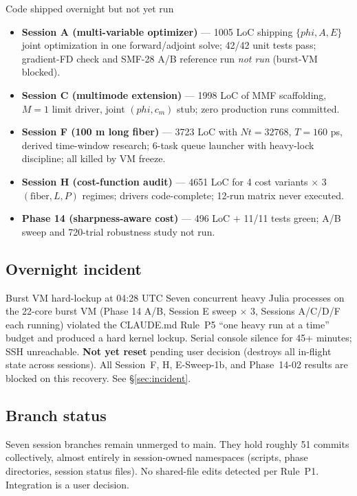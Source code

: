 \documentclass[11pt,letterpaper]{article}
\def\varphi{phi}%
\def\mathrm#1{#1}%
\def\texttt#1{#1}%
\begin{document}
\begin{verdict}{Code shipped overnight but not yet run}
\begin{itemize}[leftmargin=*]
  \item \textbf{Session A (multi-variable optimizer)} --- 1005 LoC shipping $\{\varphi,A,E\}$ joint optimization in one forward/adjoint solve; 42/42 unit tests pass; gradient-FD check and SMF-28 A/B reference run \emph{not run} (burst-VM blocked).
  \item \textbf{Session C (multimode extension)} --- 1998 LoC of MMF scaffolding, $M=1$ limit driver, joint $(\varphi, c_m)$ stub; zero production runs committed.
  \item \textbf{Session F (100 m long fiber)} --- 3723 LoC with $\mathrm{Nt}=32768$, $T=160$ ps, derived time-window research; 6-task queue launcher with heavy-lock discipline; all killed by VM freeze.
  \item \textbf{Session H (cost-function audit)} --- 4651 LoC for 4 cost variants $\times$ 3 $(\text{fiber}, L, P)$ regimes; drivers code-complete; 12-run matrix never executed.
  \item \textbf{Phase 14 (sharpness-aware cost)} --- 496 LoC $+$ 11/11 tests green; A/B sweep and 720-trial robustness study not run.
\end{itemize}
\end{verdict}

\subsection{Overnight incident}

\begin{blocker}{Burst VM hard-lockup at 04:28 UTC}
Seven concurrent heavy Julia processes on the 22-core burst VM (Phase 14 A/B, Session E sweep $\times$ 3, Sessions A/C/D/F each running) violated the CLAUDE.md Rule~P5 ``one heavy run at a time'' budget and produced a hard kernel lockup. Serial console silence for 45+ minutes; SSH unreachable. \textbf{Not yet reset} pending user decision (destroys all in-flight state across sessions). All Session~F, H, E-Sweep-1b, and Phase~14-02 results are blocked on this recovery. See \S\ref{sec:incident}.
\end{blocker}

\subsection{Branch status}

Seven session branches remain unmerged to \texttt{main}. They hold roughly 51 commits collectively, almost entirely in session-owned namespaces (scripts, phase directories, session status files). No shared-file edits detected per Rule~P1. Integration is a user decision.
\end{document}
